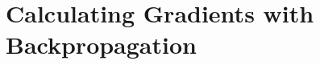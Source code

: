 \section{Calculating Gradients with Backpropagation}
\label{sec:mlp_backprop:calculating_gradients_with_backpropagation}

